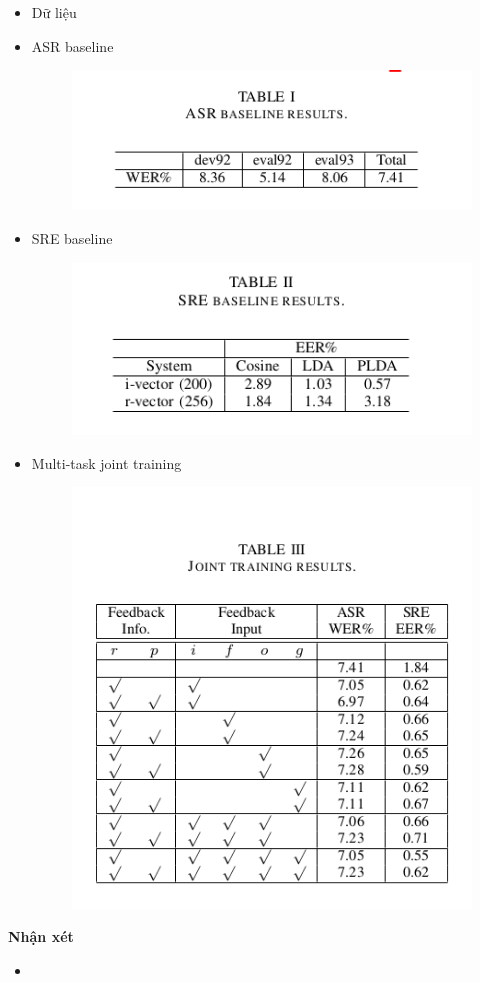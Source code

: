 \documentclass{article}
\begin{document}
	\begin{itemize}
		\item Dữ liệu
		\item ASR baseline
		\begin{figure}[H]
			\centering
			\includegraphics[width=0.5\linewidth]{images/multi-task-recurrent-model-asr-baseline-res.png}
			\label{fig:writing-thesis}
		\end{figure}
		\item SRE baseline
		\begin{figure}[H]
			\centering
			\includegraphics[width=0.5\linewidth]{images/multi-task-recurrent-model-sre-baseline-res.png}
			\label{fig:writing-thesis}
		\end{figure}
		\item Multi-task joint training
		\begin{figure}[H]
			\centering
			\includegraphics[width=0.5\linewidth]{images/multi-task-recurrent-model-joint-training-res.png}
			\label{fig:writing-thesis}
		\end{figure}
	\end{itemize}
	\textbf{Nhận xét}
	\begin{itemize}
		\item 
	\end{itemize}
\end{document}
